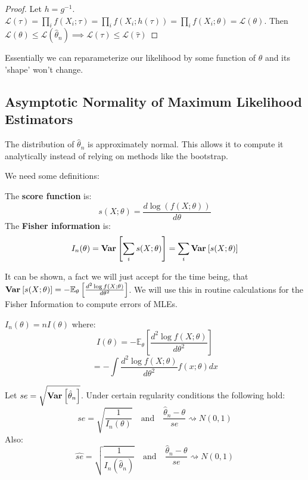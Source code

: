 \documentclass[10pt]{article}
\begin{document}
\begin{proof}
    Let $h = g^{-1}$. $\mathcal{L}(\tau) = \prod_i f(X_i; \tau) = 
    \prod_i f(X_i; h(\tau)) = \prod_i f(X_i; \theta) = \mathcal{L}(\theta)$.
    Then $\mathcal{L}(\theta) \leq \mathcal{L}(\hat{\theta}_n) \implies
    \mathcal{L}(\tau) \leq \mathcal{L}(\hat{\tau})$
\end{proof}

Essentially we can reparameterize our likelihood by some function of $\theta$
and its 'shape' won't change.

\subsection{Asymptotic Normality of Maximum Likelihood Estimators}

The distribution of $\hat{\theta}_n$ is approximately normal. This allows it to
compute it analytically instead of relying on methods like the bootstrap.

We need some definitions:

\begin{definition}
    The \textbf{score function} is:
    \[ s(X; \theta) = \frac{d\log(f(X;\theta))}{d\theta} \]
    The \textbf{Fisher information} is:
    \[ I_n(\theta) = \operatorname{\mathbf{Var}}_{}\left[\sum_i s(X; \theta)\right] = \sum_i \operatorname{\mathbf{Var}}_{}\left[s(X; \theta)\right] \]
\end{definition}

It can be shown, a fact we will just accept for the time being, that $\operatorname{\mathbf{Var}}_{}\left[s(X; \theta)\right] =
-\mathbb{E}_\theta\left[\frac{d^2\log f(X;\theta)}{d\theta^2}\right]$. We will
use this in routine calculations for the Fisher Information to compute errors
of MLEs.

\begin{theorem}
    $I_n(\theta) = nI(\theta)$ where:
    \[I(\theta) = -\mathbb{E}_\theta \left[\frac{d^2\log f(X;\theta)}{d\theta^2}\right] \]
    \[ = -\int \frac{d^2\log f(X;\theta)}{d\theta^2} f(x;\theta) dx \]
\end{theorem}

\begin{theorem}
    Let $se = \sqrt{\operatorname{\mathbf{Var}}_{}\left[\hat{\theta}_n\right]}$.
    Under certain regularity conditions the following hold:
    \[ se = \sqrt{\frac{1}{I_n(\theta)}} \quad \text{and} \quad \frac{\hat{\theta}_n - \theta}{se} \rightsquigarrow N(0, 1) \]
    Also:
    \[ \hat{se} = \sqrt{\frac{1}{I_n(\hat{\theta}_n)}} \quad \text{and} \quad
    \frac{\hat{\theta}_n - \theta}{\hat{se}} \rightsquigarrow N(0, 1) \]
\end{theorem}
\end{document}
